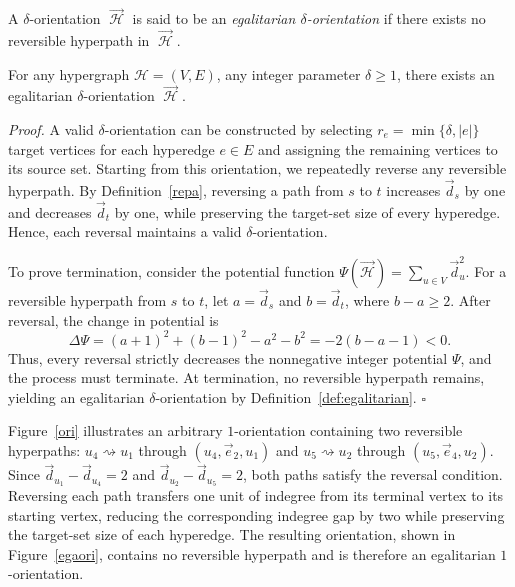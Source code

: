 \documentclass[twocolumn]{svjour3}
\begin{document}
\begin{definition}\label{def:egalitarian}
A $\delta$-orientation $\mathop{\mathcal{H}}\limits ^{\rightarrow}$ is said to be an \emph{egalitarian $\delta$-orientation} 
if there exists no reversible hyperpath in $\mathop{\mathcal{H}}\limits ^{\rightarrow}$.
\end{definition}

\begin{lemma}
\label{existence}
For any hypergraph $\mathcal{H} = (V, E)$, any integer parameter $\delta\ge1$, there exists an egalitarian 
$\delta$-orientation $\mathop{\mathcal{H}}\limits ^{\rightarrow}$.
\end{lemma}

\emph{Proof.}
A valid $\delta$-orientation can be constructed by selecting $r_e=\min\{\delta,|e|\}$ target vertices for each hyperedge $e\in E$ and assigning the remaining vertices to its source set. Starting from this orientation, we repeatedly reverse any reversible hyperpath. By Definition~\ref{repa}, reversing a path from $s$ to $t$ increases $\vec d_s$ by one and decreases $\vec d_t$ by one, while preserving the target-set size of every hyperedge. Hence, each reversal maintains a valid $\delta$-orientation.

To prove termination, consider the potential function
$\Psi(\vec{\mathcal{H}})=\sum_{u\in V}\vec d_u^2$.
For a reversible hyperpath from $s$ to $t$, let $a=\vec d_s$ and $b=\vec d_t$, where $b-a\ge 2$. After reversal, the change in potential is
\[
\Delta\Psi
=(a+1)^2+(b-1)^2-a^2-b^2
=-2(b-a-1)<0.
\]
Thus, every reversal strictly decreases the nonnegative integer potential $\Psi$, and the process must terminate. At termination, no reversible hyperpath remains, yielding an egalitarian $\delta$-orientation by Definition~\ref{def:egalitarian}.
\hfill$\square$






\begin{example}
Figure~\ref{ori} illustrates an arbitrary $1$-orientation containing
two reversible hyperpaths: $u_4\rightsquigarrow u_1$ through
$(u_4,\vec e_2,u_1)$ and $u_5\rightsquigarrow u_2$ through
$(u_5,\vec e_4,u_2)$.
Since $\vec d_{u_1}-\vec d_{u_4}=2$ and
$\vec d_{u_2}-\vec d_{u_5}=2$, both paths satisfy the reversal condition.
Reversing each path transfers one unit of indegree from its terminal
vertex to its starting vertex, reducing the corresponding indegree
gap by two while preserving the target-set size of each hyperedge.
The resulting orientation, shown in Figure~\ref{egaori}, contains
no reversible hyperpath and is therefore an egalitarian
$1$-orientation.
\end{example}
\end{document}
